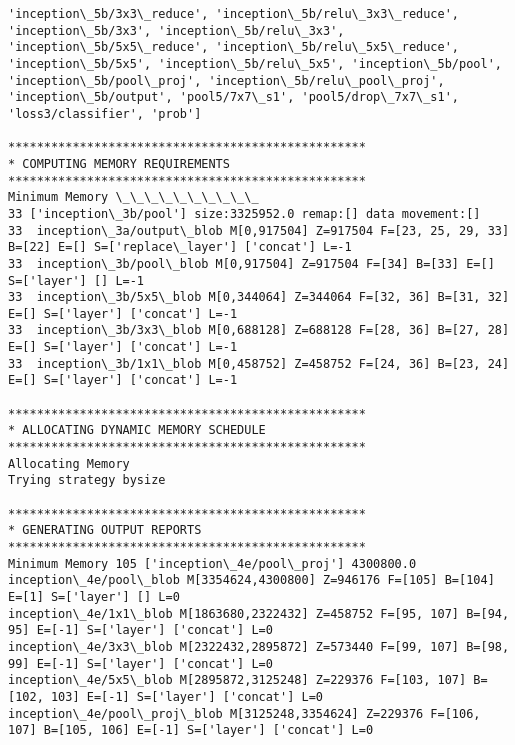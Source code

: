 \documentclass[11pt]{article}
\begin{document}
\begin{Verbatim}[commandchars=\\\{\}]
'inception\_5b/3x3\_reduce', 'inception\_5b/relu\_3x3\_reduce', 'inception\_5b/3x3', 'inception\_5b/relu\_3x3', 'inception\_5b/5x5\_reduce', 'inception\_5b/relu\_5x5\_reduce', 'inception\_5b/5x5', 'inception\_5b/relu\_5x5', 'inception\_5b/pool', 'inception\_5b/pool\_proj', 'inception\_5b/relu\_pool\_proj', 'inception\_5b/output', 'pool5/7x7\_s1', 'pool5/drop\_7x7\_s1', 'loss3/classifier', 'prob']

**************************************************
* COMPUTING MEMORY REQUIREMENTS
**************************************************
Minimum Memory \_\_\_\_\_\_\_\_\_\_
33 ['inception\_3b/pool'] size:3325952.0 remap:[] data movement:[]
33	inception\_3a/output\_blob M[0,917504] Z=917504 F=[23, 25, 29, 33] B=[22] E=[] S=['replace\_layer'] ['concat'] L=-1
33	inception\_3b/pool\_blob M[0,917504] Z=917504 F=[34] B=[33] E=[] S=['layer'] [] L=-1
33	inception\_3b/5x5\_blob M[0,344064] Z=344064 F=[32, 36] B=[31, 32] E=[] S=['layer'] ['concat'] L=-1
33	inception\_3b/3x3\_blob M[0,688128] Z=688128 F=[28, 36] B=[27, 28] E=[] S=['layer'] ['concat'] L=-1
33	inception\_3b/1x1\_blob M[0,458752] Z=458752 F=[24, 36] B=[23, 24] E=[] S=['layer'] ['concat'] L=-1

**************************************************
* ALLOCATING DYNAMIC MEMORY SCHEDULE
**************************************************
Allocating Memory
Trying strategy bysize

**************************************************
* GENERATING OUTPUT REPORTS
**************************************************
Minimum Memory 105 ['inception\_4e/pool\_proj'] 4300800.0
inception\_4e/pool\_blob M[3354624,4300800] Z=946176 F=[105] B=[104] E=[1] S=['layer'] [] L=0
inception\_4e/1x1\_blob M[1863680,2322432] Z=458752 F=[95, 107] B=[94, 95] E=[-1] S=['layer'] ['concat'] L=0
inception\_4e/3x3\_blob M[2322432,2895872] Z=573440 F=[99, 107] B=[98, 99] E=[-1] S=['layer'] ['concat'] L=0
inception\_4e/5x5\_blob M[2895872,3125248] Z=229376 F=[103, 107] B=[102, 103] E=[-1] S=['layer'] ['concat'] L=0
inception\_4e/pool\_proj\_blob M[3125248,3354624] Z=229376 F=[106, 107] B=[105, 106] E=[-1] S=['layer'] ['concat'] L=0


\end{Verbatim}
\end{document}
